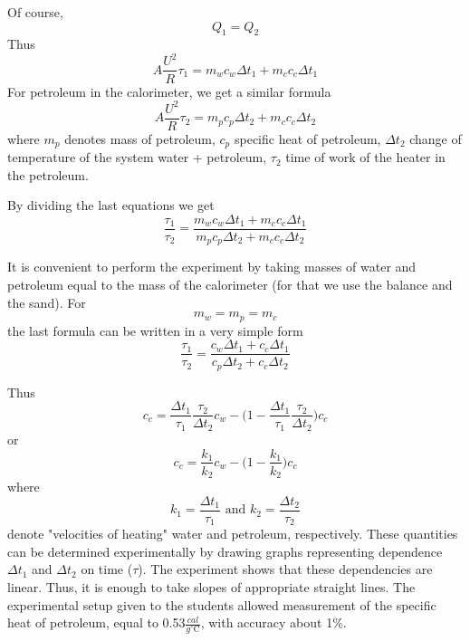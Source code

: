 \documentclass[12pt,a4paper]{book}
\begin{document}
	Of course,
	\begin{equation*}
		Q_1=Q_2
	\end{equation*}
	Thus
	\begin{equation*}
		A\frac{U^2}{R}\tau_1=m_wc_w\Delta t_1+m_cc_c\Delta t_1
	\end{equation*}
	For petroleum in the calorimeter, we get a similar formula
	\begin{equation*}
		A\frac{U^2}{R}\tau_2=m_pc_p\Delta t_2+m_cc_c\Delta t_2
	\end{equation*}
	where $m_p$ denotes mass of petroleum, $c_p$ specific heat of petroleum, $\Delta t_2$ change of temperature of the system water + petroleum, $\tau_2$ time of work of the heater in the petroleum.\par
	By dividing the last equations we get
	\begin{equation*}
		\frac{\tau_1}{\tau_2}=\frac{m_wc_w\Delta t_1+m_cc_c\Delta t_1}{m_pc_p\Delta t_2+m_cc_c\Delta t_2}
	\end{equation*}\par
	It is convenient to perform the experiment by taking masses of water and petroleum equal to the mass of the calorimeter (for that we use the balance and the sand). For
	\begin{equation*}
		m_w=m_p=m_c
	\end{equation*}
	the last formula can be written in a very simple form
	\begin{equation*}
		\frac{\tau_1}{\tau_2}=\frac{c_w\Delta t_1+c_c\Delta t_1}{c_p\Delta t_2+c_c\Delta t_2}
	\end{equation*}\par
	Thus
	\begin{equation*}
		c_c=\frac{\Delta t_1}{\tau_1}\frac{\tau_2}{\Delta t_2}c_w-\Big(1-\frac{\Delta t_1}{\tau_1}\frac{\tau_2}{\Delta t_2}\Big)c_c
	\end{equation*}
	or
	\begin{equation}
		c_c=\frac{k_1}{k_2}c_w-\Big(1-\frac{k_1}{k_2}\Big)c_c
	\end{equation}
	where
	\begin{equation*}
		k_1=\frac{\Delta t_1}{\tau_1}\text{ and }k_2=\frac{\Delta t_2}{\tau_2}
	\end{equation*}
	denote "velocities of heating" water and petroleum, respectively. These quantities can be determined experimentally by drawing graphs representing dependence $\Delta t_1$ and $\Delta t_2$ on time ($\tau$). The experiment shows that these dependencies are linear. Thus, it is enough to take slopes of appropriate straight lines. The experimental setup given to the students allowed measurement of the specific heat of petroleum, equal to 0.53$\frac{cal}{g^{\circ}\mathrm{C}}$, with accuracy about 1\%.\par
\end{document}
